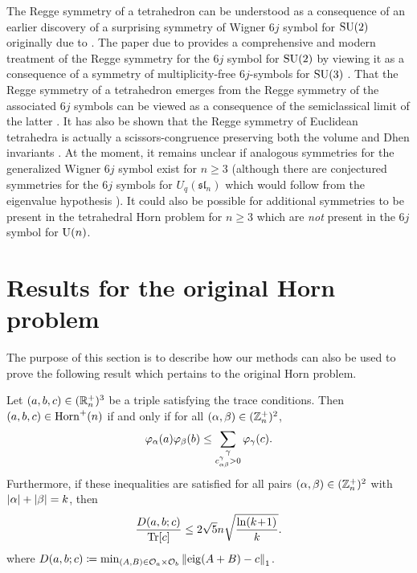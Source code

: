 \documentclass[notitlepage, 11pt, letterpaper]{amsart}
\begin{document}
\begin{rem}
    The Regge symmetry of a tetrahedron can be understood as a consequence of an earlier discovery of a surprising symmetry of Wigner $6j$ symbol for $\operatorname{SU}(2)$ originally due to \citeauthor{regge1959symmetry} \cite{regge1959symmetry}.
    The paper due to \citeauthor{boalch2007regge} provides a comprehensive and modern treatment of the Regge symmetry for the $6j$ symbol for $\operatorname{SU}(2)$ by viewing it as a consequence of a symmetry of multiplicity-free $6j$-symbols for $\operatorname{SU}(3)$ \cite{boalch2007regge}.
    That the Regge symmetry of a tetrahedron emerges from the Regge symmetry of the associated $6j$ symbols can be viewed as a consequence of the semiclassical limit of the latter \cite{ponzano1968semiclassical,roberts1999classical}.
    It has also be shown that the Regge symmetry of Euclidean tetrahedra is actually a scissors-congruence preserving both the volume and Dhen invariants \cite{akopyan2019regge}.
    At the moment, it remains unclear if analogous symmetries for the generalized Wigner $6j$ symbol exist for $n \geq 3$ (although there are conjectured symmetries for the $6j$ symbols for $U_q(\mathfrak{sl}_n)$ which would follow from the eigenvalue hypothesis \cite{morozov2018new,lanina2023tug}).
    It could also be possible for additional symmetries to be present in the tetrahedral Horn problem for $n \geq 3$ which are \textit{not} present in the $6j$ symbol for $\operatorname{U}(n)$.
\end{rem}


\section{Results for the original Horn problem}
\label{sec:new_ineq_horn_orig}

The purpose of this section is to describe how our methods can also be used to prove the following result which pertains to the original Horn problem.

\begin{thm}
    \label{thm:tri_iff}
    Let $(a,b,c) \in (\mathbb R^{+}_{n})^3$ be a triple satisfying the trace conditions.
    Then $(a,b,c) \in \operatorname{Horn}^{+}(n)$ if and only if for all $(\alpha,\beta) \in (\mathbb Z^{+}_{n})^2$,
    \begin{equation}
        \label{eq:tri_iff}
        \varphi_{\alpha}(a)\varphi_{\beta}(b)
        \leq \sum_{\substack{\gamma\\c^{\gamma}_{\alpha\beta} > 0}} \varphi_{\gamma}(c).
    \end{equation}
    Furthermore, if these inequalities are satisfied for all pairs $(\alpha,\beta) \in (\mathbb Z^{+}_{n})^2$ with $|\alpha| + |\beta| = k$, then
    \begin{equation}
        \label{eq:tri_dist_bound}
        \frac{D(a,b;c)}{\operatorname{Tr}[c]} \leq 2 \sqrt{5} n \sqrt{\frac{\ln (k\!+\!1)^{}}{k}}.
    \end{equation}
    where $D(a,b;c)\coloneqq \min_{(A,B) \in \mathcal O_a \times \mathcal O_b} \left\lVert\operatorname{eig}(A+B)-c\right\rVert_{1}$.
\end{thm}
\end{document}

